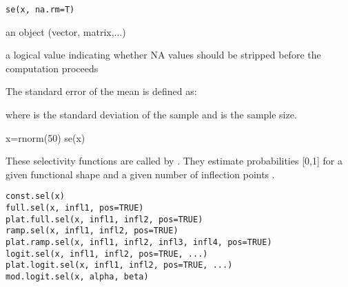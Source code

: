 \documentclass[a4paper]{book}
\begin{document}
\newpage
{}
%
\begin{Usage}
\begin{verbatim}
se(x, na.rm=T)
\end{verbatim}
\end{Usage}
%
\begin{Arguments}
\begin{ldescription}
\item[\code{x}] an \R{} object (vector, matrix,...)

\item[\code{na.rm}] a logical value indicating whether NA values should be stripped before the computation proceeds

\end{ldescription}
\end{Arguments}
%
\begin{Details}\relax
The standard error of the mean is defined as:


where  is the standard deviation of the sample and  is the sample size.

\end{Details}
%
\begin{Examples}
\begin{ExampleCode}
x=rnorm(50)
se(x)
\end{ExampleCode}
\end{Examples}
\newpage
{}
%
\begin{Description}\relax
These selectivity functions are called by . They estimate probabilities [0,1] for a given functional shape and a given number of inflection points .
\end{Description}
%
\begin{Usage}
\begin{verbatim}
const.sel(x)
full.sel(x, infl1, pos=TRUE)
plat.full.sel(x, infl1, infl2, pos=TRUE)
ramp.sel(x, infl1, infl2, pos=TRUE)
plat.ramp.sel(x, infl1, infl2, infl3, infl4, pos=TRUE)
logit.sel(x, infl1, infl2, pos=TRUE, ...)
plat.logit.sel(x, infl1, infl2, pos=TRUE, ...)
mod.logit.sel(x, alpha, beta)
\end{verbatim}
\end{Usage}
\end{document}
